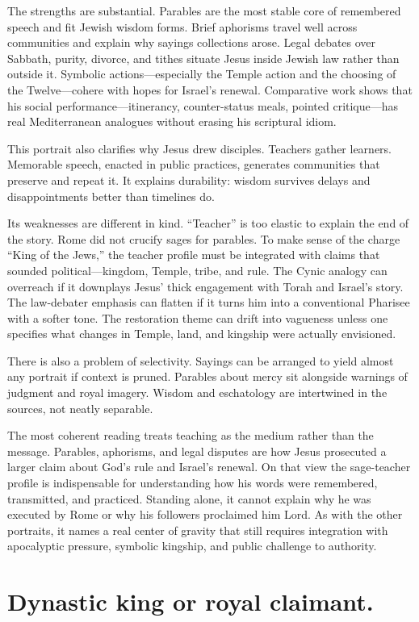 The strengths are substantial.
Parables are the most stable core of remembered speech and fit Jewish wisdom forms.
Brief aphorisms travel well across communities and explain why sayings collections arose.
Legal debates over Sabbath, purity, divorce, and tithes situate Jesus inside Jewish law rather than outside it.
Symbolic actions—especially the Temple action and the choosing of the Twelve—cohere with hopes for Israel’s renewal.
Comparative work shows that his social performance—itinerancy, counter-status meals, pointed critique—has real Mediterranean analogues without erasing his scriptural idiom.

This portrait also clarifies why Jesus drew disciples.
Teachers gather learners.
Memorable speech, enacted in public practices, generates communities that preserve and repeat it.
It explains durability: wisdom survives delays and disappointments better than timelines do.

Its weaknesses are different in kind.
“Teacher” is too elastic to explain the end of the story.
Rome did not crucify sages for parables.
To make sense of the charge “King of the Jews,” the teacher profile must be integrated with claims that sounded political—kingdom, Temple, tribe, and rule.
The Cynic analogy can overreach if it downplays Jesus’ thick engagement with Torah and Israel’s story.
The law-debater emphasis can flatten if it turns him into a conventional Pharisee with a softer tone.
The restoration theme can drift into vagueness unless one specifies what changes in Temple, land, and kingship were actually envisioned.

There is also a problem of selectivity.
Sayings can be arranged to yield almost any portrait if context is pruned.
Parables about mercy sit alongside warnings of judgment and royal imagery.
Wisdom and eschatology are intertwined in the sources, not neatly separable.

The most coherent reading treats teaching as the medium rather than the message.
Parables, aphorisms, and legal disputes are how Jesus prosecuted a larger claim about God’s rule and Israel’s renewal.
On that view the sage-teacher profile is indispensable for understanding how his words were remembered, transmitted, and practiced.
Standing alone, it cannot explain why he was executed by Rome or why his followers proclaimed him Lord.
As with the other portraits, it names a real center of gravity that still requires integration with apocalyptic pressure, symbolic kingship, and public challenge to authority.

\section{Dynastic king or royal claimant.}\label{sec:dynastic}

